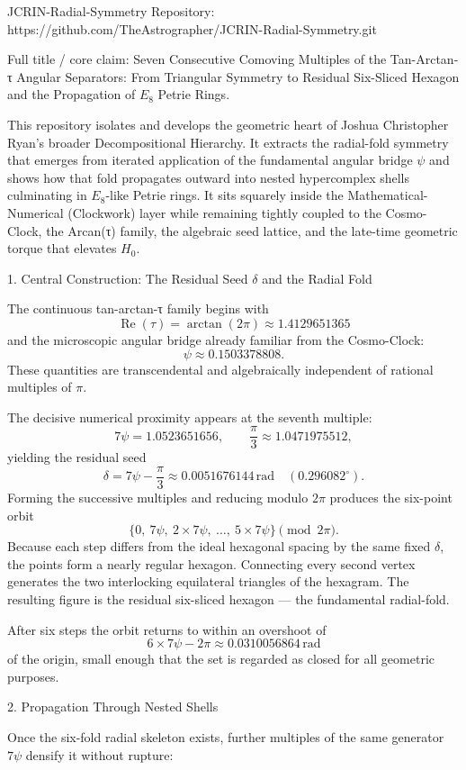 JCRIN-Radial-Symmetry  
Repository: https://github.com/TheAstrographer/JCRIN-Radial-Symmetry.git  

Full title / core claim:  
Seven Consecutive Comoving Multiples of the Tan-Arctan-τ Angular Separators: From Triangular Symmetry to Residual Six-Sliced Hexagon and the Propagation of \(E_8\) Petrie Rings.

This repository isolates and develops the geometric heart of Joshua Christopher Ryan’s broader Decompositional Hierarchy. It extracts the radial-fold symmetry that emerges from iterated application of the fundamental angular bridge \(\psi\) and shows how that fold propagates outward into nested hypercomplex shells culminating in \(E_8\)-like Petrie rings. It sits squarely inside the Mathematical-Numerical (Clockwork) layer while remaining tightly coupled to the Cosmo-Clock, the Arcan(τ) family, the algebraic seed lattice, and the late-time geometric torque that elevates \(H_0\).

1. Central Construction: The Residual Seed \(\delta\) and the Radial Fold

The continuous tan-arctan-τ family begins with
\[
\operatorname{Re}(\tau)=\arctan(2\pi)\approx 1.4129651365
\]
and the microscopic angular bridge already familiar from the Cosmo-Clock:
\[
\psi\approx 0.1503378808.
\]
These quantities are transcendental and algebraically independent of rational multiples of \(\pi\).

The decisive numerical proximity appears at the seventh multiple:
\[
7\psi=1.0523651656,\qquad
\frac{\pi}{3}\approx 1.0471975512,
\]
yielding the residual seed
\[
\delta=7\psi-\frac{\pi}{3}\approx 0.0051676144\,\mathrm{rad}\quad(0.296082^\circ).
\]
Forming the successive multiples and reducing modulo \(2\pi\) produces the six-point orbit
\[
\bigl\{0,\ 7\psi,\ 2\times7\psi,\ \dots,\ 5\times7\psi\bigr\}\pmod{2\pi}.
\]
Because each step differs from the ideal hexagonal spacing by the same fixed \(\delta\), the points form a nearly regular hexagon. Connecting every second vertex generates the two interlocking equilateral triangles of the hexagram. The resulting figure is the residual six-sliced hexagon — the fundamental radial-fold.

After six steps the orbit returns to within an overshoot of
\[
6\times7\psi-2\pi\approx 0.0310056864\,\mathrm{rad}
\]
of the origin, small enough that the set is regarded as closed for all geometric purposes.

2. Propagation Through Nested Shells

Once the six-fold radial skeleton exists, further multiples of the same generator \(7\psi\) densify it without rupture:

